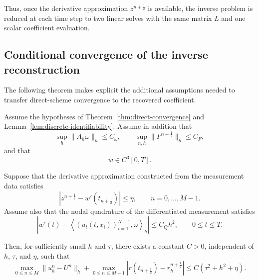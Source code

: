 \documentclass[reqno]{amsart}
\begin{document}
Thus, once the derivative approximation $z^{n+\frac12}$ is available,
the inverse problem is reduced at each time step to two linear solves
with the same matrix $L$ and one scalar coefficient evaluation.

\subsection{Conditional convergence of the inverse reconstruction}
The following theorem makes explicit the additional assumptions needed to transfer direct-scheme convergence to the recovered coefficient.

\begin{theorem}
\label{thm:inverse-convergence}
Assume the hypotheses of
Theorem~\ref{thm:direct-convergence} and
Lemma~\ref{lem:discrete-identifiability}.
Assume in addition that
\begin{equation}
\sup_h\|A_h\omega\|_h\le C_\omega,
\qquad
\sup_{n,h}\|F^{n+\frac12}\|_h\le C_F,
\label{eq:inverse-uniform-bounds}
\end{equation}
and that
\[
w\in C^3[0,T].
\]

Suppose that the derivative approximation constructed from the
measurement data satisfies
\begin{equation}
\left|
z^{n+\frac12}
-
w'(t_{n+\frac12})
\right|
\le
\eta,
\qquad
n=0,\ldots,M-1.
\label{eq:derivative-error-revised}
\end{equation}
Assume also that the nodal quadrature of the differentiated
measurement satisfies
\begin{equation}
\left|
w'(t)
-
\left\langle
(u_t(t,x_i))_{i=1}^{N-1},
\omega
\right\rangle_h
\right|
\le
C_Qh^2,
\qquad
0\le t\le T.
\label{eq:measurement-quadrature-revised}
\end{equation}

Then, for sufficiently small \(h\) and \(\tau\), there exists a
constant \(C>0\), independent of \(h\), \(\tau\), and \(\eta\), such
that
\begin{equation}
\max_{0\le n\le M}
\|u_h^n-U^n\|_h
+
\max_{0\le n\le M-1}
\left|
r(t_{n+\frac12})
-
r_h^{n+\frac12}
\right|
\le
C(\tau^2+h^2+\eta).
\label{eq:coupled-convergence-revised}
\end{equation}
\end{theorem}
\end{document}
